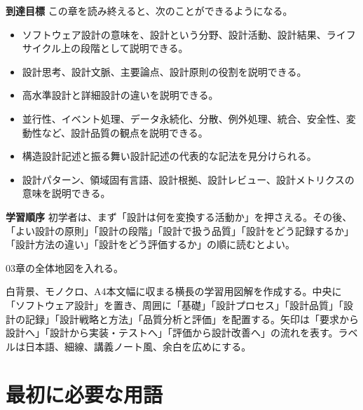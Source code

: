 \documentclass[10.5pt,a4paper]{ltjsarticle}
\begin{document}
\textbf{到達目標} この章を読み終えると、次のことができるようになる。
\begin{itemize}
  \item ソフトウェア設計の意味を、設計という分野、設計活動、設計結果、ライフサイクル上の段階として説明できる。
  \item 設計思考、設計文脈、主要論点、設計原則の役割を説明できる。
  \item 高水準設計と詳細設計の違いを説明できる。
  \item 並行性、イベント処理、データ永続化、分散、例外処理、統合、安全性、変動性など、設計品質の観点を説明できる。
  \item 構造設計記述と振る舞い設計記述の代表的な記法を見分けられる。
  \item 設計パターン、領域固有言語、設計根拠、設計レビュー、設計メトリクスの意味を説明できる。
\end{itemize}

\textbf{学習順序} 初学者は、まず「設計は何を変換する活動か」を押さえる。その後、「よい設計の原則」「設計の段階」「設計で扱う品質」「設計をどう記録するか」「設計方法の違い」「設計をどう評価するか」の順に読むとよい。

\begin{todobox}
03章の全体地図を入れる。
\end{todobox}
\begin{promptbox}
白背景、モノクロ、A4本文幅に収まる横長の学習用図解を作成する。中央に「ソフトウェア設計」を置き、周囲に「基礎」「設計プロセス」「設計品質」「設計の記録」「設計戦略と方法」「品質分析と評価」を配置する。矢印は「要求から設計へ」「設計から実装・テストへ」「評価から設計改善へ」の流れを表す。ラベルは日本語、細線、講義ノート風、余白を広めにする。
\end{promptbox}

\section*{最初に必要な用語}
\end{document}
